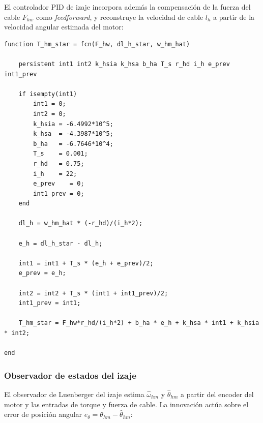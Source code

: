 \documentclass[12pt, a4paper]{article}
\begin{document}
El controlador PID de izaje incorpora además la compensación de la fuerza del cable
$F_{hw}$ como \textit{feedforward}, y reconstruye la velocidad de cable $\dot{l}_h$
a partir de la velocidad angular estimada del motor:

\begin{lstlisting}[style=matlab, basicstyle=\ttfamily\scriptsize, caption={MATLAB Function: controlador PID de izaje de carga ($T_{s2}=1$\,ms).}, label=lst:pid-izaje]
function T_hm_star = fcn(F_hw, dl_h_star, w_hm_hat)

    persistent int1 int2 k_hsia k_hsa b_ha T_s r_hd i_h e_prev int1_prev

    if isempty(int1)
        int1 = 0;
        int2 = 0;
        k_hsia = -6.4992*10^5;
        k_hsa  = -4.3987*10^5;
        b_ha   = -6.7646*10^4;
        T_s    = 0.001;
        r_hd   = 0.75;
        i_h    = 22;
        e_prev    = 0;
        int1_prev = 0;
    end

    dl_h = w_hm_hat * (-r_hd)/(i_h*2);

    e_h = dl_h_star - dl_h;

    int1 = int1 + T_s * (e_h + e_prev)/2;
    e_prev = e_h;

    int2 = int2 + T_s * (int1 + int1_prev)/2;
    int1_prev = int1;

    T_hm_star = F_hw*r_hd/(i_h*2) + b_ha * e_h + k_hsa * int1 + k_hsia * int2;

end
\end{lstlisting}

\subsubsection{Observador de estados del izaje}

El observador de Luenberger del izaje estima $\hat{\omega}_{hm}$ y $\hat{\theta}_{hm}$
a partir del encoder del motor y las entradas de torque y fuerza de cable.
La innovación actúa sobre el error de posición angular $e_\theta = \theta_{hm} - \hat{\theta}_{hm}$:
\end{document}
